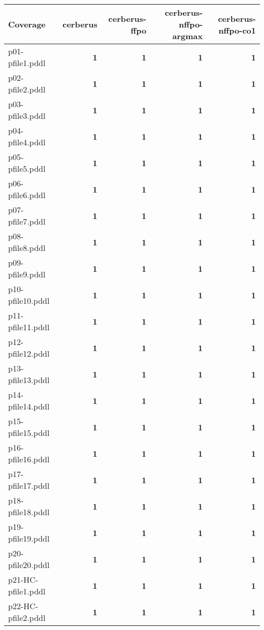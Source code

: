 \documentclass{article}
\begin{document}
\begin{tabular}{@{}lrrrr@{}}
Coverage & cerberus & cerberus-ffpo & cerberus-nffpo-argmax & cerberus-nffpo-co1 \\
\midrule
p01-pfile1.pddl & \textbf{1} & \textbf{1} & \textbf{1} & \textbf{1} \\
p02-pfile2.pddl & \textbf{1} & \textbf{1} & \textbf{1} & \textbf{1} \\
p03-pfile3.pddl & \textbf{1} & \textbf{1} & \textbf{1} & \textbf{1} \\
p04-pfile4.pddl & \textbf{1} & \textbf{1} & \textbf{1} & \textbf{1} \\
p05-pfile5.pddl & \textbf{1} & \textbf{1} & \textbf{1} & \textbf{1} \\
p06-pfile6.pddl & \textbf{1} & \textbf{1} & \textbf{1} & \textbf{1} \\
p07-pfile7.pddl & \textbf{1} & \textbf{1} & \textbf{1} & \textbf{1} \\
p08-pfile8.pddl & \textbf{1} & \textbf{1} & \textbf{1} & \textbf{1} \\
p09-pfile9.pddl & \textbf{1} & \textbf{1} & \textbf{1} & \textbf{1} \\
p10-pfile10.pddl & \textbf{1} & \textbf{1} & \textbf{1} & \textbf{1} \\
p11-pfile11.pddl & \textbf{1} & \textbf{1} & \textbf{1} & \textbf{1} \\
p12-pfile12.pddl & \textbf{1} & \textbf{1} & \textbf{1} & \textbf{1} \\
p13-pfile13.pddl & \textbf{1} & \textbf{1} & \textbf{1} & \textbf{1} \\
p14-pfile14.pddl & \textbf{1} & \textbf{1} & \textbf{1} & \textbf{1} \\
p15-pfile15.pddl & \textbf{1} & \textbf{1} & \textbf{1} & \textbf{1} \\
p16-pfile16.pddl & \textbf{1} & \textbf{1} & \textbf{1} & \textbf{1} \\
p17-pfile17.pddl & \textbf{1} & \textbf{1} & \textbf{1} & \textbf{1} \\
p18-pfile18.pddl & \textbf{1} & \textbf{1} & \textbf{1} & \textbf{1} \\
p19-pfile19.pddl & \textbf{1} & \textbf{1} & \textbf{1} & \textbf{1} \\
p20-pfile20.pddl & \textbf{1} & \textbf{1} & \textbf{1} & \textbf{1} \\
p21-HC-pfile1.pddl & \textbf{1} & \textbf{1} & \textbf{1} & \textbf{1} \\
p22-HC-pfile2.pddl & \textbf{1} & \textbf{1} & \textbf{1} & \textbf{1} \\

\end{tabular}
\end{document}

